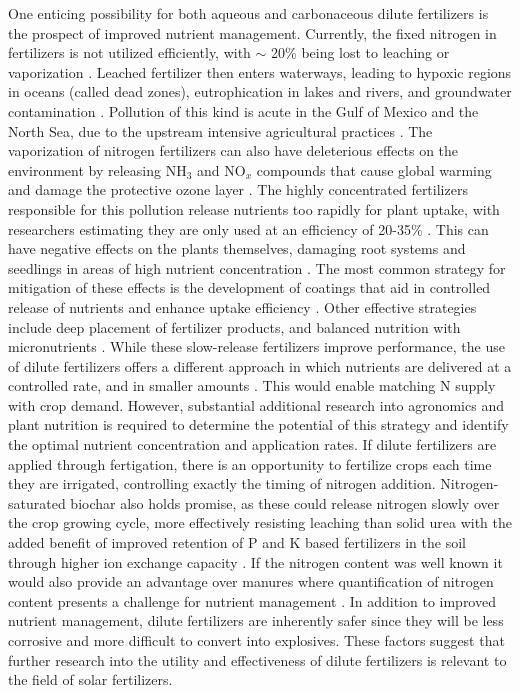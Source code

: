 One enticing possibility for both aqueous and carbonaceous dilute fertilizers is the prospect of improved nutrient management. Currently, the fixed nitrogen in fertilizers is not utilized efficiently, with $\sim$ 20\% being lost to leaching or vaporization \cite{Smil_1999_2, Naz_2016}. Leached fertilizer then enters waterways, leading to hypoxic regions in oceans (called dead zones), eutrophication in lakes and rivers, and groundwater contamination \cite{Diaz2008,Conley_2009,Shindo_2006}.  Pollution of this kind is acute in the Gulf of Mexico and the North Sea, due to the upstream intensive agricultural practices \cite{Diaz2008,Conley_2009}. The vaporization of nitrogen fertilizers can also have deleterious effects on the environment by releasing NH$_3$ and NO$_x$ compounds that cause global warming and damage the protective ozone layer \cite{Ravishankara_2009}. The highly concentrated fertilizers responsible for this pollution release nutrients too rapidly for plant uptake, with researchers estimating they are only used at an efficiency of 20-35\% \cite{Naz_2016}. This can have negative effects on the plants themselves, damaging root systems and seedlings in areas of high nutrient concentration \cite{Morgan2009}. The most common strategy for mitigation of these effects is the development of coatings that aid in controlled release of nutrients and enhance uptake efficiency \cite{Naz_2016}. Other effective strategies include deep placement of fertilizer products, and balanced nutrition with micronutrients \cite{angle2017role}. While these slow-release fertilizers improve performance, the use of dilute fertilizers offers a different approach in which nutrients are delivered at a controlled rate, and in smaller amounts \cite{kadyampakeni_2015, Flink_1995}. This would enable matching N supply with crop demand. However, substantial additional research into agronomics and plant nutrition is required to determine the potential of this strategy and identify the optimal nutrient concentration and application rates. If dilute fertilizers are applied through fertigation, there is an opportunity to fertilize crops each time they are irrigated, controlling exactly the timing of nitrogen addition. Nitrogen-saturated biochar also holds promise, as these could release nitrogen slowly over the crop growing cycle, more effectively resisting leaching than solid urea with the added benefit of improved retention of P and K based fertilizers in the soil through higher ion exchange capacity \cite{Glaser2002}. If the nitrogen content was well known it would also provide an advantage over manures where quantification of nitrogen content presents a challenge for nutrient management \cite{Ye}. In addition to improved nutrient management, dilute fertilizers are inherently safer since they will be less corrosive and more difficult to convert into explosives. These factors suggest that further research into the utility and effectiveness of dilute fertilizers is relevant to the field of solar fertilizers.

